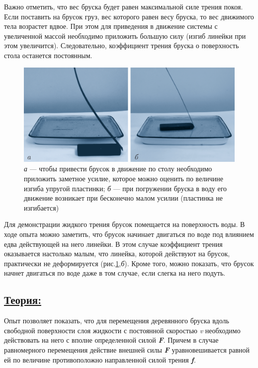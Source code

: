 \documentclass[14pt,a4paper,oneside]{extarticle}	%
\begin{document}
	Важно отметить, что вес бруска будет равен максимальной силе трения покоя.
	Если поставить на брусок груз, вес которого равен весу бруска, то вес движимого тела возрастет вдвое.
	При этом для приведения в движение системы с увеличенной массой необходимо приложить большую силу (изгиб линейки при этом увеличится).
	Следовательно, коэффициент трения бруска о поверхность стола останется постоянным.
	
		\begin{figure}[H] 
		\centering 	
		\includegraphics[width=0.75\linewidth]{friction-2.png}
		\caption{\textit{а} — чтобы привести брусок в движение по столу необходимо приложить заметное усилие, которое можно оценить по величине изгиба упругой пластинки; \textit{б} — при погружении бруска в воду его движение возникает при бесконечно малом усилии (пластинка не изгибается) }
		\label{friction-2}
	\end{figure}

	Для демонстрации жидкого трения брусок помещается на поверхность воды.
	В ходе опыта можно заметить, что брусок начинает двигаться по воде под влиянием едва действующей на него линейки.
	В этом случае коэффициент трения оказывается настолько малым, что линейка, 
	которой действуют на брусок, практически не деформируется (рис.\ref{friction-2},\textit{б}).
	Кроме того, можно показать, что брусок начнет двигаться по воде даже в том случае, 
	если слегка на него подуть.
	


	\newpage	
\subsection*{\underline{Теория:}}

Опыт позволяет показать, что для перемещения деревянного бруска вдоль свободной поверхности слоя жидкости с постоянной скоростью \textit{v} необходимо действовать на него с вполне определенной силой \textit{\textbf{F}}.
Причем в случае равномерного перемещения действие внешней силы \textit{\textbf{F}} уравновешивается равной ей по величине противоположно направленной силой трения \textit{\textbf{f}}.
\end{document}
